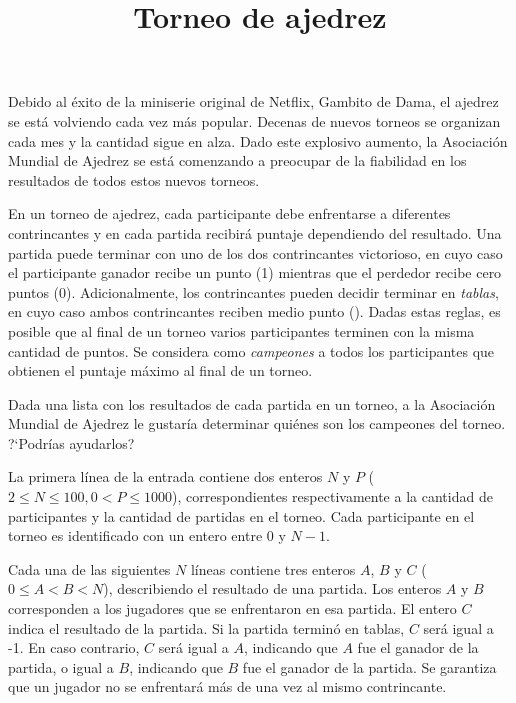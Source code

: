 \documentclass{oci}
\title{Torneo de ajedrez}
\begin{document}
\begin{problemDescription}
  Debido al éxito de la miniserie original de Netflix, Gambito de Dama, el ajedrez
  se está volviendo cada vez más popular.
  Decenas de nuevos torneos se organizan cada mes y la cantidad sigue en alza.
  Dado este explosivo aumento, la Asociación Mundial de Ajedrez se está comenzando a preocupar
  de la fiabilidad en los resultados de todos estos nuevos torneos.

  En un torneo de ajedrez, cada participante debe enfrentarse a diferentes contrincantes y en cada
  partida recibirá puntaje dependiendo del resultado.
  Una partida puede terminar con uno de los dos contrincantes victorioso, en cuyo caso el
  participante ganador recibe un punto (1) mientras que el perdedor recibe cero puntos (0).
  Adicionalmente, los contrincantes pueden decidir terminar en \emph{tablas}, en cuyo caso ambos
  contrincantes reciben medio punto ().
  Dadas estas reglas, es posible que al final de un torneo varios participantes terminen con
  la misma cantidad de puntos.
  Se considera como \emph{campeones} a todos los participantes que obtienen el puntaje máximo
  al final de un torneo.

  Dada una lista con los resultados de cada partida en un torneo, a la Asociación
  Mundial de Ajedrez le gustaría determinar quiénes son los campeones del torneo.
  ?`Podrías ayudarlos?
\end{problemDescription}

\begin{inputDescription}
  La primera línea de la entrada contiene dos enteros $N$ y $P$
  ($2 \leq N \leq 100, 0 < P \leq 1000$),
  correspondientes respectivamente a la cantidad de participantes y la cantidad de partidas
  en el torneo.
  Cada participante en el torneo es identificado con un entero entre 0 y $N-1$.

  Cada una de las siguientes $N$ líneas contiene tres enteros $A$, $B$ y $C$
  ($0\leq A < B < N$), describiendo el resultado de una partida.
  Los enteros $A$ y $B$ corresponden a los jugadores que se enfrentaron en esa partida.
  El entero $C$ indica el resultado de la partida.
  Si la partida terminó en tablas, $C$ será igual a {-1}.
  En caso contrario, $C$ será igual a $A$, indicando que $A$ fue el ganador de la partida, o igual
  a $B$, indicando que $B$ fue el ganador de la partida.
  Se garantiza que un jugador no se enfrentará más de una vez al mismo contrincante.
\end{inputDescription}
\end{document}
